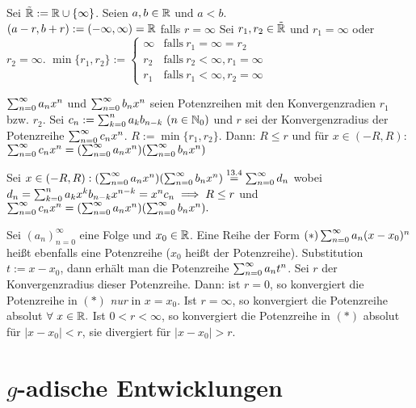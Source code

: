 \documentclass[a4paper,oneside,DIV15,BCOR12mm]{scrbook}
\begin{document}
\begin{vereinbarung}
Sei $\tilde {\mathbb{R}}:=\mathbb{R} \cup \{\infty\}$. Seien $a, b \in\mathbb{R}$ und $a<b$.\\
$(a-r, b+r) := (-\infty, \infty) = \mathbb{R}$ falls $r=\infty$
Sei $r_1, r_2 \in\tilde{\mathbb{R}}$ und $r_1=\infty$ oder $r_2=\infty$.
$\min\{r_1, r_2\} := \begin{cases}
\infty & \text{falls}\ r_1=\infty=r_2\\
r_2 & \text{falls}\ r_2<\infty, r_1=\infty \\
r_1 & \text{falls}\ r_1<\infty, r_2=\infty
\end{cases}$
\end{vereinbarung}

\begin{satz}
$\sum_{n=0}^{\infty}{a_nx^n}$ und $\sum_{n=0}^{\infty}{b_nx^n}$ seien Potenzreihen mit den Konvergenzradien $r_1$ bzw. $r_2$. Sei $c_n:=\sum_{k=0}^{n}{a_kb_{n-k}}\ (n\in\MdN_0)$ und $r$ sei der Konvergenzradius der Potenzreihe $\sum_{n=0}^{\infty}{c_nx^n}$. $R:=\min\{r_1, r_2\}$. Dann: $R\le r$ und für $x \in (-R, R):$ $\sum_{n=0}^{\infty}{c_nx^n}=(\sum_{n=0}^{\infty}{a_nx^n})(\sum_{n=0}^{\infty}{b_nx^n})$
\end{satz}

\begin{beweis}
Sei $x \in (-R, R): (\sum_{n=0}^{\infty}{a_nx^n})(\sum_{n=0}^{\infty}{b_nx^n})\overset{\text{13.4}}{=}\sum_{n=0}^{\infty}{d_n}$ wobei \\$d_n = \sum^{n}_{k=0}{a_kx^kb_{n-k}x^{n-k}} = x^nc_n \implies R\le r$ und \\$\sum_{n=0}^{\infty}{c_nx^n}=(\sum_{n=0}^{\infty}{a_nx^n})(\sum_{n=0}^{\infty}{b_nx^n}).$
\end{beweis}

\begin{bemerkung}
Sei $(a_n)^{\infty}_{n=0}$ eine Folge und $x_0 \in\mathbb{R}$. Eine Reihe der Form $(*) \sum_{n=0}^{\infty}{a_n(x-x_0)^n}$ heißt ebenfalls eine Potenzreihe ($x_0$ heißt  der Potenzreihe). Substitution $t:=x-x_0$, dann erhält man die Potenzreihe $\sum_{n=0}^{\infty}{a_nt^n}$. Sei $r$ der Konvergenzradius dieser Potenzreihe. Dann: ist $r=0$, so konvergiert die Potenzreihe in $(*)$ \emph{nur} in $x=x_0$. Ist $r=\infty$, so konvergiert die Potenzreihe absolut $\forall\ x\in\mathbb{R}.$ Ist $0<r<\infty$, so konvergiert die Potenzreihe in $(*)$ absolut für $|x-x_0|<r$, sie divergiert für $|x-x_0|>r.$ 
\end{bemerkung}

\chapter{$g$-adische Entwicklungen}
\end{document}
